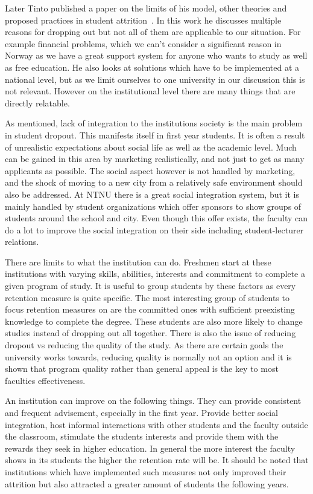 \bigskip\noindent
Later Tinto published a paper on the limits of his model, other theories and proposed practices in student attrition~\cite{1982}.
In this work he discusses multiple reasons for dropping out but not all of them are applicable to our situation. For example financial problems, which we can't consider a significant reason in Norway as we have a great support system for anyone who wants to study as well as free education.
He also looks at solutions which have to be implemented at a national level, but as we limit ourselves to one university in our discussion this is not relevant.
However on the institutional level there are many things that are directly relatable.

\bigskip\noindent
As mentioned, lack of integration to the institutions society is the main problem in student dropout.
This manifests itself in first year students.
It is often a result of unrealistic expectations about social life as well as the academic level.
Much can be gained in this area by marketing realistically, and not just to get as many applicants as possible.
The social aspect however is not handled by marketing, and the shock of moving to a new city from a relatively safe environment should also be addressed.
At NTNU there is a great social integration system, but it is mainly handled by student organizations which offer sponsors to show groups of students around the school and city.
Even though this offer exists, the faculty can do a lot to improve the social integration on their side including student-lecturer relations.

\bigskip\noindent
There are limits to what the institution can do.
Freshmen start at these institutions with varying skills, abilities, interests and commitment to complete a given program of study.
It is useful to group students by these factors as every retention measure is quite specific.
The most interesting group of students to focus retention measures on are the committed ones with sufficient preexisting knowledge to complete the degree.
These students are also more likely to change studies instead of dropping out all together.
There is also the issue of reducing dropout vs reducing the quality of the study.
As there are certain goals the university works towards, reducing quality is normally not an option and it is shown that program quality rather than general appeal is the key to most faculties effectiveness.

\bigskip\noindent
An institution can improve on the following things.
They can provide consistent and frequent advisement, especially in the first year.
Provide better social integration,
host informal interactions with other students and the faculty outside the classroom,
stimulate the students interests and provide them with the rewards they seek in higher education.
In general the more interest the faculty shows in its students the higher the retention rate will be.
It should be noted that institutions which have implemented such measures not only improved their attrition but also attracted a greater amount of students the following years.

